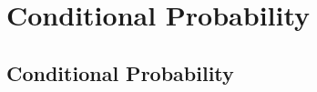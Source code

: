 \chapter{Conditional Probability}
\label{ch:conditionalprob}
\setlength{\parindent}{1em}

\section{Conditional Probability}
